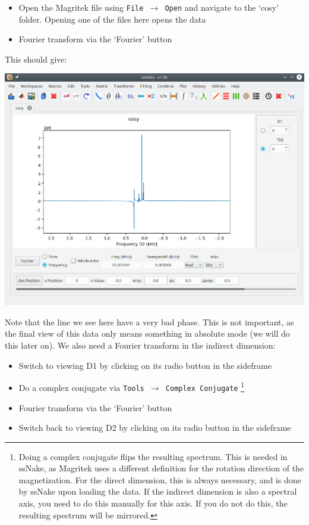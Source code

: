 \documentclass[11pt,a4paper]{article}
\begin{document}
\begin{itemize}
  \item Open the Magritek file using \texttt{File $\longrightarrow$ Open}
  and navigate to the `cosy' folder. Opening one of the files here opens the data
  \item Fourier transform via the `Fourier' button
\end{itemize}
This should give:
\begin{center}
\includegraphics[width=0.8\linewidth]{Figs/Fig1.png}
\end{center}
Note that the line we see here have a very bad phase. This is not important, as the final view of
this data only means something in absolute mode (we will do this later on). We also need a Fourier
transform in the indirect dimension:

\begin{itemize}
  \item Switch to viewing D1 by clicking on its radio button in the sideframe
\item Do a complex conjugate via \texttt{Tools $\longrightarrow$ Complex Conjugate} \footnote{Doing
	 a complex conjugate flips the resulting spectrum. This is needed in ssNake, as Magritek uses a
	 different definition for the rotation direction of the magnetization. For the direct dimension,
	 this is always necessary, and is done by ssNake upon loading the data. If the indirect dimension
  is also a spectral axis, you need to do this manually for this axis. If you do not do this, the
resulting spectrum will be mirrored.}
  \item Fourier transform via the `Fourier' button
  \item Switch back to viewing D2 by clicking on its radio button in the sideframe
\end{itemize}
\end{document}
